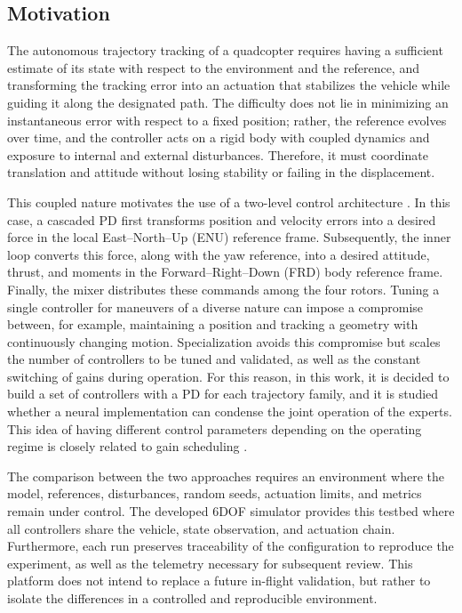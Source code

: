 \subsection{Motivation}
\label{subsec:motivacion-contexto}

The autonomous trajectory tracking of a quadcopter requires having a sufficient estimate of its state with respect to the environment and the reference, and transforming the tracking error into an actuation that stabilizes the vehicle while guiding it along the designated path. The difficulty does not lie in minimizing an instantaneous error with respect to a fixed position; rather, the reference evolves over time, and the controller acts on a rigid body with coupled dynamics and exposure to internal and external disturbances. Therefore, it must coordinate translation and attitude without losing stability or failing in the displacement.

This coupled nature motivates the use of a two-level control architecture \cite{beard2012small,mellinger2011minimum,lee2010geometric}. In this case, a cascaded PD first transforms position and velocity errors into a desired force in the local East--North--Up (ENU) reference frame. Subsequently, the inner loop converts this force, along with the yaw reference, into a desired attitude, thrust, and moments in the Forward--Right--Down (FRD) body reference frame. Finally, the mixer distributes these commands among the four rotors. Tuning a single controller for maneuvers of a diverse nature can impose a compromise between, for example, maintaining a position and tracking a geometry with continuously changing motion. Specialization avoids this compromise but scales the number of controllers to be tuned and validated, as well as the constant switching of gains during operation. For this reason, in this work, it is decided to build a set of controllers with a PD for each trajectory family, and it is studied whether a neural implementation can condense the joint operation of the experts. This idea of having different control parameters depending on the operating regime is closely related to gain scheduling \cite{leith2000survey}.

The comparison between the two approaches requires an environment where the model, references, disturbances, random seeds, actuation limits, and metrics remain under control. The developed 6DOF simulator provides this testbed where all controllers share the vehicle, state observation, and actuation chain. Furthermore, each run preserves traceability of the configuration to reproduce the experiment, as well as the telemetry necessary for subsequent review. This platform does not intend to replace a future in-flight validation, but rather to isolate the differences in a controlled and reproducible environment.

